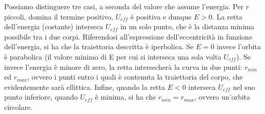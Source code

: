 \documentclass[10pt,a4paper]{article}
\begin{document}
Possiamo distinguere tre casi, a seconda del valore che assume l'energia. Per $r$ piccoli, domina il termine positivo, $U_{eff}$ è positiva e dunque $E > 0$. La retta dell'energia (costante)  interseca $U_{eff}$ in un solo punto, che è la distanza minima possibile tra i due corpi. Riferendosi all'espressione dell'eccentricità in funzione dell'energia, si ha che la traiettoria descritta è iperbolica. Se $E = 0$ invece l'orbita è parabolica (il valore minimo di E per cui si interseca una sola volta $U_{eff}$). Se invece l'energia è minore di zero, la retta intersecherà la curva in due punti: $r_{min}$ ed $r_{max}$, ovvero i punti entro i quali è contenuta la traiettoria del corpo, che evidentemente sarà ellittica. Infine, quando la retta $E<0$ interseca $U_{eff}$ nel suo punto inferiore, quando $U_{eff}$ è minima, si ha che $r_{min}=r_{max}$, ovvero un'orbita circolare. 
\end{document}
